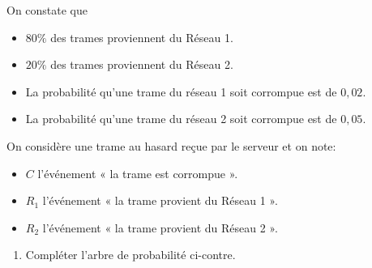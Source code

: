  \begin{minipage}{0.65\textwidth}
On constate que\begin{itemize}
    \item $80\%$ des trames proviennent du Réseau 1.
    \item $20\%$ des trames proviennent du Réseau 2.
    \item La probabilité qu'une trame du réseau 1 soit corrompue est de $0,02$.
    \item La probabilité qu'une trame du réseau 2 soit corrompue est de $0,05$.
\end{itemize}

On considère une trame au hasard reçue par le serveur et on note:
\begin{itemize}
    \item $C$ l'événement « la trame est corrompue ».
    \item $R_1$ l'événement « la trame provient du Réseau 1 ».
    \item $R_2$ l'événement « la trame provient du Réseau 2 ».
\end{itemize}


\medskip

\begin{enumerate}[series=monDS, resume]
    \item Compléter l'arbre de probabilité ci-contre.
\end{enumerate}

\end{minipage}\hfill{}
